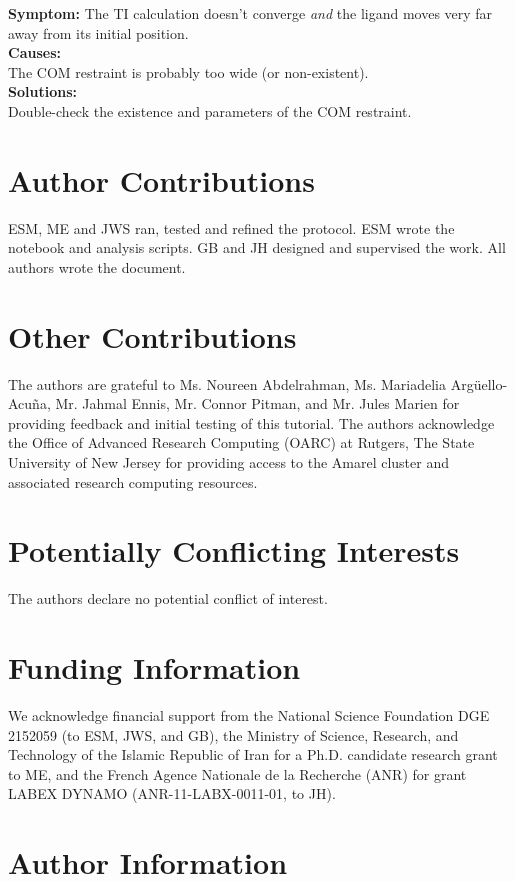 \documentclass[9pt,tutorial,pubversion]{Styling/livecoms}
\begin{document}
\noindent\textbf{Symptom:} The TI calculation doesn't converge \emph{and} the ligand moves very far away from its initial position. \\
\textbf{Causes:}\\
The COM restraint is probably too wide (or non-existent).\\
\textbf{Solutions:}\\
Double-check the existence and parameters of the COM restraint.\\

\setcounter{section}{3}
\renewcommand\thesection{\arabic{section}}
\section{Author Contributions}
ESM, ME and JWS ran, tested and refined the protocol.
ESM wrote the notebook and analysis scripts.
GB and JH designed and supervised the work.
All authors wrote the document.

\section{Other Contributions}
The authors are grateful to 
Ms. Noureen Abdelrahman, 
Ms. Mariadelia Arg\"uello-Acu\~na,
Mr. Jahmal Ennis, 
Mr. Connor Pitman, and
Mr. Jules Marien
for providing feedback and initial testing of this tutorial. The authors acknowledge the Office of Advanced Research Computing (OARC) at Rutgers, The State University of New Jersey for providing access to the Amarel cluster and associated research computing resources. 

\section{Potentially Conflicting Interests}
The authors declare no potential conflict of interest.


\section{Funding Information}
We acknowledge financial support from the National Science Foundation DGE 2152059 (to ESM, JWS, and GB), the Ministry of Science, Research, and Technology of the Islamic Republic of Iran for a Ph.D. candidate research grant to ME, and the French Agence Nationale de la Recherche (ANR) for grant LABEX DYNAMO (ANR-11-LABX-0011-01, to JH).

\section*{Author Information}
\makeorcid

% 

\end{document}
